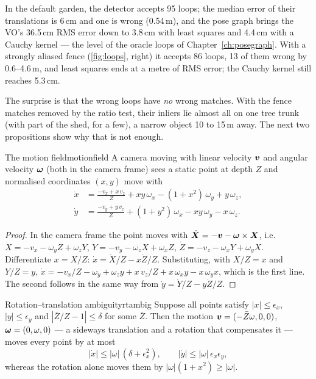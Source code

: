 In the default garden, the detector accepts 95 loops; the median error
of their translations is 6\,cm and one is wrong (0.54\,m), and the pose
graph brings the VO's 36.5\,cm RMS error down to 3.8\,cm with least
squares and 4.4\,cm with a Cauchy kernel --- the level of the oracle
loops of Chapter~\ref{ch:posegraph}. With a strongly aliased fence
(\cref{fig:loops}, right) it accepts 86 loops, 13 of them wrong by
0.6--4.6\,m, and least squares ends at a metre of RMS error; the Cauchy
kernel still reaches 5.3\,cm.

The surprise is that the wrong loops have \emph{no} wrong matches. With
the fence matches removed by the ratio test, their inliers lie almost
all on one tree trunk (with part of the shed, for a few), a narrow
object 10 to 15\,m away. The
next two propositions show why that is not enough.

\begin{proposition}{The motion field}{motionfield}
A camera moving with linear velocity $\bm{v}$ and angular velocity
$\bm{\omega}$ (both in the camera frame) sees a static point at depth $Z$
and normalised coordinates $(x,y)$ move with
\begin{equation}\label{eq:motionfield}
\begin{aligned}
\dot x&=\frac{-v_x+x\,v_z}{Z}+xy\,\omega_x-(1+x^2)\,\omega_y+y\,\omega_z,\\
\dot y&=\frac{-v_y+y\,v_z}{Z}+(1+y^2)\,\omega_x-xy\,\omega_y-x\,\omega_z.
\end{aligned}
\end{equation}
\end{proposition}

\begin{proof}
In the camera frame the point moves with $\dot{\bm{X}}=-\bm{v}-
\bm{\omega}\times\bm{X}$, i.e.\ $\dot X=-v_x-\omega_yZ+\omega_zY$,
$\dot Y=-v_y-\omega_zX+\omega_xZ$, $\dot Z=-v_z-\omega_xY+\omega_yX$.
Differentiate $x=X/Z$: $\dot x=\dot X/Z-x\dot Z/Z$. Substituting, with
$X/Z=x$ and $Y/Z=y$,
$\dot x=-v_x/Z-\omega_y+\omega_zy+x\,v_z/Z+x\,\omega_xy-x\,\omega_yx$,
which is the first line. The second follows in the same way from
$\dot y=\dot Y/Z-y\dot Z/Z$.
\end{proof}

\begin{proposition}{Rotation--translation ambiguity}{rtambig}
Suppose all points satisfy $|x|\le\epsilon_x$, $|y|\le\epsilon_y$ and
$|\bar Z/Z-1|\le\delta$ for some $\bar Z$. Then the motion
$\bm{v}=(-\bar Z\omega,0,0)$, $\bm{\omega}=(0,\omega,0)$ --- a sideways
translation and a rotation that compensates it --- moves every point by
at most
\begin{equation}\label{eq:rtambig}
|\dot x|\le|\omega|\,(\delta+\epsilon_x^2),\qquad
|\dot y|\le|\omega|\,\epsilon_x\epsilon_y ,
\end{equation}
whereas the rotation alone moves them by $|\omega|(1+x^2)\ge|\omega|$.
\end{proposition}

